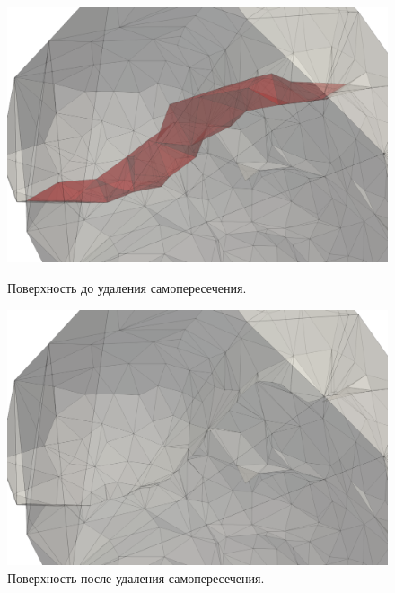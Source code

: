 \documentclass[
11pt,%
tightenlines,%
twoside,%
onecolumn,%
nofloats,%
nobibnotes,%
nofootinbib,%
superscriptaddress,%
noshowpacs,%
centertags]%
{revtex4}
\begin{document}
\begin{figure}[h]
  \centering
  \begin{minipage}[h]{0.49\textwidth}
    \includegraphics[width=\textwidth]{pics/pic_self_intersection_on.png}
    \caption{Поверхность до удаления самопересечения.}\label{fig:pic_self_intersection_on}
  \end{minipage}
  \hfill
  \begin{minipage}[h]{0.49\textwidth}
    \includegraphics[width=\textwidth]{pics/pic_self_intersection_off.png}
    \caption{Поверхность после удаления самопересечения.}\label{fig:pic_self_intersection_off}
  \end{minipage}
\end{figure}
\end{document}
